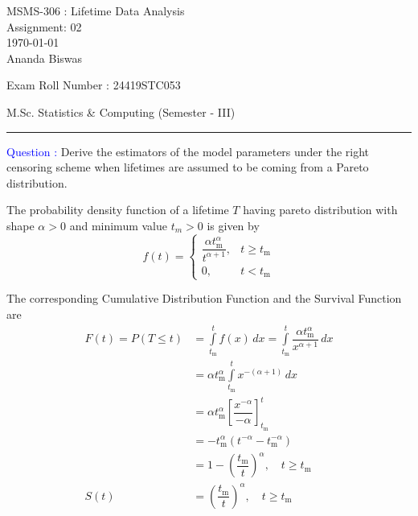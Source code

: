 \documentclass[12pt, a4paper, onecolumn, answers]{exam}
\begin{document}
\begingroup  
    \centering
    \LARGE MSMS-306 : Lifetime Data Analysis\\
    \LARGE Assignment: 02\\[0.5em]
    \large \today\\[0.5em]
    \large Ananda Biswas \par
    \large Exam Roll Number : 24419STC053 \par
    \large M.Sc. Statistics \& Computing (Semester - III)\par
\endgroup
\rule{\textwidth}{0.4pt}
\pointsdroppedatright   %
\printanswers
\unframedsolutions
\renewcommand{\solutiontitle}{\noindent\textbf{Ans:}\enspace}   %

\begin{questions}    
	\question \textcolor{blue}{Question : }Derive the estimators of the model parameters under the right censoring scheme when lifetimes are assumed to be coming from a Pareto distribution.
    
\begin{solution}
The probability density function of a lifetime $T$ having pareto distribution with shape $\alpha > 0$ and minimum value $t_m > 0$ is given by
\[
f(t) = 
\begin{cases}
\dfrac{\alpha t_\mathrm{m}^\alpha}{t^{\alpha + 1}}, & t \geq t_\mathrm{m} \\
0, & t < t_\mathrm{m}
\end{cases}
\]

The corresponding Cumulative Distribution Function and the Survival Function are
\begin{align*}
F(t) = P(T \leq t) &= \int \limits_{t_\mathrm{m}}^t f(x) \, dx = \int \limits_{t_\mathrm{m}}^t \dfrac{\alpha t_\mathrm{m}^\alpha}{x^{\alpha + 1}} \, dx \\[0.25em]
     &= \alpha t_\mathrm{m}^\alpha \int \limits_{t_\mathrm{m}}^t x^{-(\alpha + 1)} \, dx \\[0.25em]
     &= \alpha t_\mathrm{m}^\alpha \left[ \dfrac{x^{-\alpha}}{-\alpha} \right]_{t_\mathrm{m}}^t \\[0.25em]
     &= -t_\mathrm{m}^\alpha \left( t^{-\alpha} - t_\mathrm{m}^{-\alpha} \right) \\[0.25em]
     &= 1 - \left( \dfrac{t_\mathrm{m}}{t} \right)^{\alpha}, \quad t \geq t_\mathrm{m} \\[2em]
S(t) &= \left( \dfrac{t_\mathrm{m}}{t} \right)^{\alpha}, \quad t \geq t_\mathrm{m}
\end{align*}


\end{solution}
\end{questions}
\end{document}
